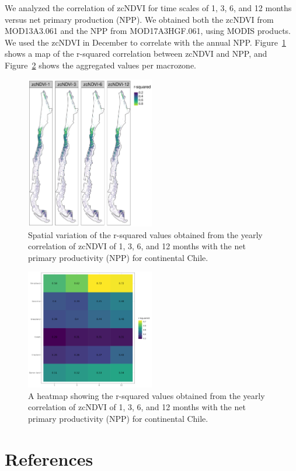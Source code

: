 \documentclass[
  authoryear,
  preprint,
  3p,
  onecolumn]{elsarticle}
\begin{document}
We analyzed the correlation of zcNDVI for time scales of 1, 3, 6, and 12
months versus net primary production (NPP). We obtained both the zcNDVI
from MOD13A3.061 and the NPP from MOD17A3HGF.061, using MODIS products.
We used the zcNDVI in December to correlate with the annual NPP.
Figure~\ref{fig-r2_npp_zcNDVI} shows a map of the r-squared correlation
between zcNDVI and NPP, and Figure~\ref{fig-hetmap_npp_zcndvi} shows the
aggregated values per macrozone.

\begin{figure}[!ht]

{\centering \includegraphics[width=0.5\textwidth,height=\textheight]{../output/figs/map_r2_NPP_vs_zcNDVI.png}

}

\caption{\label{fig-r2_npp_zcNDVI}Spatial variation of the r-squared
values obtained from the yearly correlation of zcNDVI of 1, 3, 6, and 12
months with the net primary productivity (NPP) for continental Chile.}

\end{figure}

\begin{figure}[!ht]

{\centering \includegraphics[width=0.5\textwidth,height=\textheight]{../output/figs/heatmap_r2_npp_vs_zcndvi_per_landcover.png}

}

\caption{\label{fig-hetmap_npp_zcndvi}A heatmap showing the r-squared
values obtained from the yearly correlation of zcNDVI of 1, 3, 6, and 12
months with the net primary productivity (NPP) for continental Chile.}

\end{figure}

\newpage

\hypertarget{references}{%
\section*{References}\label{references}}

\renewcommand{\bibsection}{}

\end{document}
